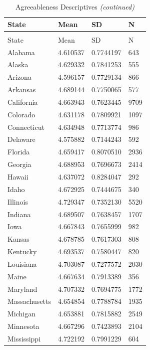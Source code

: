 \documentclass[
  english,
  man]{apa6}
\begin{document}
\begingroup\fontsize{12}{14}\selectfont

\begin{landscape}
\begin{longtable}[t]{llll}
\caption{\label{tab:KableOuput}Agreeableness Descriptives}\\
\toprule
State & Mean & SD & N\\
\midrule
\endfirsthead
\caption[]{\label{tab:KableOuput}Agreeableness Descriptives \textit{(continued)}}\\
\toprule
State & Mean & SD & N\\
\midrule
\endhead

\endfoot
\bottomrule
\endlastfoot
Alabama & 4.610537 & 0.7744197 & 643\\
Alaska & 4.629332 & 0.7841253 & 555\\
Arizona & 4.596157 & 0.7729134 & 866\\
Arkansas & 4.689144 & 0.7750065 & 577\\
California & 4.663943 & 0.7623445 & 9709\\
\addlinespace
Colorado & 4.631178 & 0.7809921 & 1097\\
Connecticut & 4.634948 & 0.7713774 & 986\\
Delaware & 4.575882 & 0.7144243 & 592\\
Florida & 4.659417 & 0.8070510 & 2936\\
Georgia & 4.688953 & 0.7696673 & 2414\\
\addlinespace
Hawaii & 4.637072 & 0.8284047 & 292\\
Idaho & 4.672925 & 0.7444675 & 340\\
Illinois & 4.729347 & 0.7352130 & 5520\\
Indiana & 4.689507 & 0.7638457 & 1707\\
Iowa & 4.667843 & 0.7655999 & 982\\
\addlinespace
Kansas & 4.678785 & 0.7617303 & 808\\
Kentucky & 4.693537 & 0.7580447 & 820\\
Louisiana & 4.703087 & 0.7277572 & 2030\\
Maine & 4.667634 & 0.7913389 & 356\\
Maryland & 4.707332 & 0.7694775 & 1772\\
\addlinespace
Massachusetts & 4.654854 & 0.7788784 & 1935\\
Michigan & 4.653881 & 0.7815882 & 2549\\
Minnesota & 4.667296 & 0.7423893 & 2104\\
Mississippi & 4.722192 & 0.7991229 & 604\\

\end{longtable}
\end{landscape}
\end{document}
